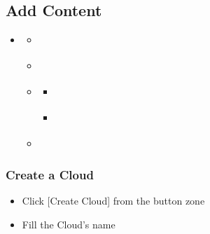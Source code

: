 \documentclass[a4paper,12pt,english]{sphinxmanual}
\begin{document}
\subsection{Add Content}
\label{\detokenize{platform/add_content:add-content}}\label{\detokenize{platform/add_content::doc}}
\begin{sphinxShadowBox}
\begin{itemize}
\item {} 
\label{\detokenize{platform/add_content:id1}}{\hyperref[\detokenize{platform/add_content:add-content}]{}}
\begin{itemize}
\item {} 
\label{\detokenize{platform/add_content:id2}}{\hyperref[\detokenize{platform/add_content:create-a-cloud}]{}}

\item {} 
\label{\detokenize{platform/add_content:id3}}{\hyperref[\detokenize{platform/add_content:create-a-project}]{}}

\item {} 
\label{\detokenize{platform/add_content:id4}}{\hyperref[\detokenize{platform/add_content:upload-your-content}]{}}
\begin{itemize}
\item {} 
\label{\detokenize{platform/add_content:id5}}{\hyperref[\detokenize{platform/add_content:add-your-models}]{}}

\item {} 
\label{\detokenize{platform/add_content:id6}}{\hyperref[\detokenize{platform/add_content:add-your-documents}]{}}

\end{itemize}

\item {} 
\label{\detokenize{platform/add_content:id7}}{\hyperref[\detokenize{platform/add_content:add-bcf}]{}}

\end{itemize}

\end{itemize}
\end{sphinxShadowBox}


\subsubsection{Create a Cloud}
\label{\detokenize{platform/add_content:create-a-cloud}}
\begin{itemize}
\item {} 
Click {[}Create Cloud{]}  from the button zone

\item {} 
Fill the Cloud’s name

\end{itemize}
\end{document}
